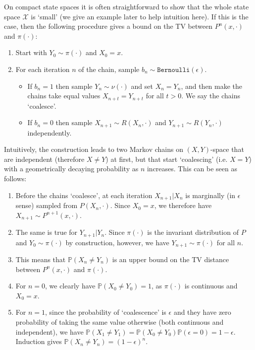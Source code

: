 \documentclass{article}
\newcommand{\X}{\mathcal{X}}
\begin{document}
On compact state spaces it is often straightforward to show that the whole state space $\X$ is `small' (we give an example later to help intuition here).  If this is the case, then the following procedure gives a bound on the TV between $P^n(x,\cdot)$ and $\pi(\cdot)$:
\begin{enumerate}
\item Start with $Y_0 \sim \pi(\cdot)$ and $X_0 = x$.
\item For each iteration $n$ of the chain, sample $b_n \sim \texttt{Bernoulli}(\epsilon)$. 
\begin{itemize}
\item If $b_n = 1$ then sample $Y_n \sim \nu(\cdot)$ and set $X_n = Y_n$, and then make the chains take equal values $X_{n+t}=Y_{n+t}$ for all $t>0$. We say the chains  `coalesce'.
\item If $b_n = 0$ then sample $X_{n+1} \sim R(X_n,\cdot)$ and $Y_{n+1} \sim R(Y_{n},\cdot)$ independently.
\end{itemize}
\end{enumerate}
Intuitively, the construction leads to two Markov chains on $(X,Y)$-space that are independent (therefore $X\neq Y$) at first, but that start `coalescing' (i.e. $X=Y$) with a geometrically decaying probability as $n$ increases. This can be seen as follows:
\begin{enumerate}
\item Before the chains `coalesce', at each iteration $X_{n+1}|X_n$ is marginally (in $\epsilon$ sense) sampled from $P(X_n,\cdot)$. Since $X_0=x$, we therefore have $X_{n+1} \sim P^{n+1}(x,\cdot)$.
\item The same is true for $Y_{n+1}|Y_n$. Since $\pi(\cdot)$ is the invariant distribution  of $P$ and $Y_0\sim\pi(\cdot)$ by construction, however, we have $Y_{n+1} \sim \pi(\cdot)$ for all $n$.
\item This means that $\mathbb{P}(X_n \neq Y_n)$ is an upper bound on the TV distance between $P^{n}(x,\cdot)$ and $\pi(\cdot)$.
\item For $n=0$, we clearly have $\mathbb{P}(X_0 \neq Y_0)=1$, as $\pi(\cdot)$ is continuous and $X_0 = x$.
\item For $n=1$, since the probability of `coalescence' is $\epsilon$ and they have zero probability of taking the same value otherwise (both continuous and independent), we have $\mathbb{P}(X_1 \neq Y_1)=\mathbb{P}(X_0 \neq Y_0)\mathbb{P}(\epsilon=0)=1-\epsilon$.  Induction gives $\mathbb{P}(X_n \neq Y_n) = (1-\epsilon)^n$. 
\end{enumerate}
\end{document}
